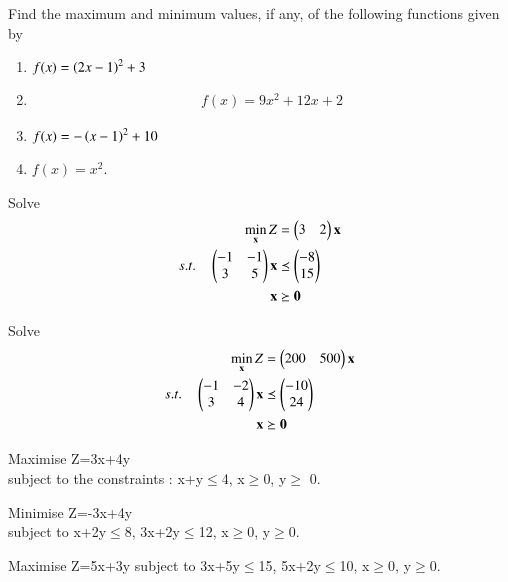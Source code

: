 
\item Find the maximum and minimum values, if any, of the following functions given by 
%
\begin{enumerate}
\item $f(x) = \left(2x-1\right)^2+3$
\\
\solution

\item 
\begin{align}
    f(x)=9x^2+12x+2 
\end{align}
%
\solution

\item $f(x) = -\left(x-1\right)^2+10$
\item $f(x) = x^2$.
\end{enumerate}
\item Solve
\begin{align}
\min_{\mathbf{x}} Z &= \begin{pmatrix}3 & 2\end{pmatrix}\mathbf{x}
\\
s.t. \quad 
\begin{pmatrix}
-1 & -1
\\
3 & 5
\end{pmatrix}
\mathbf{x} &\preceq \begin{pmatrix}-8\\15\end{pmatrix}
\\
\mathbf{x} &\succeq \mathbf{0}
\end{align}
\item Solve
\begin{align}
\min_{\mathbf{x}} Z &= \begin{pmatrix}200 & 500\end{pmatrix}\mathbf{x}
\\
s.t. \quad 
\begin{pmatrix}
-1 & -2
\\
3 & 4
\end{pmatrix}
\mathbf{x} &\preceq \begin{pmatrix}-10\\24\end{pmatrix}
\\
\mathbf{x} &\succeq \mathbf{0}
\end{align}
\item Maximise Z=3x+4y\\
subject to the constraints : x+y$\leq$4, x$\geq$0, y$\geq$ 0.\\
\item Minimise Z=-3x+4y\\
subject to x+2y$\leq$8, 3x+2y$\leq$12, x$\geq$0, y$\geq$0.\\
\item Maximise Z=5x+3y
subject to 3x+5y$\leq$15, 5x+2y$\leq$10, x$\geq$0, y$\geq$0.\\
